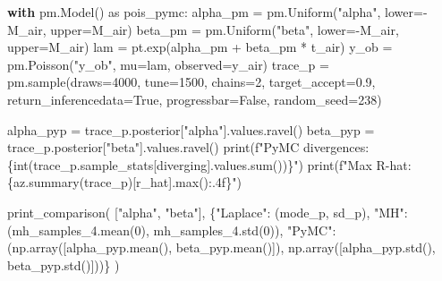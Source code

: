 \documentclass[
  letterpaper,
  DIV=11,
  numbers=noendperiod]{scrartcl}
\newenvironment{Shaded}{\begin{snugshade}}{\end{snugshade}}
\newcommand{\BuiltInTok}[1]{\textcolor[rgb]{0.00,0.23,0.31}{#1}}
\newcommand{\ControlFlowTok}[1]{\textcolor[rgb]{0.00,0.23,0.31}{\textbf{#1}}}
\newcommand{\DecValTok}[1]{\textcolor[rgb]{0.68,0.00,0.00}{#1}}
\newcommand{\FloatTok}[1]{\textcolor[rgb]{0.68,0.00,0.00}{#1}}
\newcommand{\ImportTok}[1]{\textcolor[rgb]{0.00,0.46,0.62}{#1}}
\newcommand{\NormalTok}[1]{\textcolor[rgb]{0.00,0.23,0.31}{#1}}
\newcommand{\OperatorTok}[1]{\textcolor[rgb]{0.37,0.37,0.37}{#1}}
\newcommand{\SpecialCharTok}[1]{\textcolor[rgb]{0.37,0.37,0.37}{#1}}
\newcommand{\SpecialStringTok}[1]{\textcolor[rgb]{0.13,0.47,0.30}{#1}}
\newcommand{\StringTok}[1]{\textcolor[rgb]{0.13,0.47,0.30}{#1}}
\newcommand{\VariableTok}[1]{\textcolor[rgb]{0.07,0.07,0.07}{#1}}
\begin{document}
\begin{Shaded}
\begin{Highlighting}[]
\ControlFlowTok{with}\NormalTok{ pm.Model() }\ImportTok{as}\NormalTok{ pois\_pymc:}
\NormalTok{    alpha\_pm }\OperatorTok{=}\NormalTok{ pm.Uniform(}\StringTok{"alpha"}\NormalTok{, lower}\OperatorTok{={-}}\NormalTok{M\_air, upper}\OperatorTok{=}\NormalTok{M\_air)}
\NormalTok{    beta\_pm  }\OperatorTok{=}\NormalTok{ pm.Uniform(}\StringTok{"beta"}\NormalTok{,  lower}\OperatorTok{={-}}\NormalTok{M\_air, upper}\OperatorTok{=}\NormalTok{M\_air)}
\NormalTok{    lam }\OperatorTok{=}\NormalTok{ pt.exp(alpha\_pm }\OperatorTok{+}\NormalTok{ beta\_pm }\OperatorTok{*}\NormalTok{ t\_air)}
\NormalTok{    y\_ob }\OperatorTok{=}\NormalTok{ pm.Poisson(}\StringTok{"y\_ob"}\NormalTok{, mu}\OperatorTok{=}\NormalTok{lam, observed}\OperatorTok{=}\NormalTok{y\_air)}
\NormalTok{    trace\_p }\OperatorTok{=}\NormalTok{ pm.sample(draws}\OperatorTok{=}\DecValTok{4000}\NormalTok{, tune}\OperatorTok{=}\DecValTok{1500}\NormalTok{, chains}\OperatorTok{=}\DecValTok{2}\NormalTok{,}
\NormalTok{                        target\_accept}\OperatorTok{=}\FloatTok{0.9}\NormalTok{, return\_inferencedata}\OperatorTok{=}\VariableTok{True}\NormalTok{,}
\NormalTok{                        progressbar}\OperatorTok{=}\VariableTok{False}\NormalTok{, random\_seed}\OperatorTok{=}\DecValTok{238}\NormalTok{)}

\NormalTok{alpha\_pyp }\OperatorTok{=}\NormalTok{ trace\_p.posterior[}\StringTok{"alpha"}\NormalTok{].values.ravel()}
\NormalTok{beta\_pyp  }\OperatorTok{=}\NormalTok{ trace\_p.posterior[}\StringTok{"beta"}\NormalTok{].values.ravel()}
\BuiltInTok{print}\NormalTok{(}\SpecialStringTok{f"PyMC divergences: }\SpecialCharTok{\{}\BuiltInTok{int}\NormalTok{(trace\_p.sample\_stats[}\StringTok{\textquotesingle{}diverging\textquotesingle{}}\NormalTok{].values.}\BuiltInTok{sum}\NormalTok{())}\SpecialCharTok{\}}\SpecialStringTok{"}\NormalTok{)}
\BuiltInTok{print}\NormalTok{(}\SpecialStringTok{f"Max R{-}hat: }\SpecialCharTok{\{}\NormalTok{az}\SpecialCharTok{.}\NormalTok{summary(trace\_p)[}\StringTok{\textquotesingle{}r\_hat\textquotesingle{}}\NormalTok{]}\SpecialCharTok{.}\BuiltInTok{max}\NormalTok{()}\SpecialCharTok{:.4f\}}\SpecialStringTok{"}\NormalTok{)}

\NormalTok{print\_comparison(}
\NormalTok{    [}\StringTok{"alpha"}\NormalTok{, }\StringTok{"beta"}\NormalTok{],}
\NormalTok{    \{}\StringTok{"Laplace"}\NormalTok{: (mode\_p, sd\_p),}
     \StringTok{"MH"}\NormalTok{:      (mh\_samples\_4.mean(}\DecValTok{0}\NormalTok{), mh\_samples\_4.std(}\DecValTok{0}\NormalTok{)),}
     \StringTok{"PyMC"}\NormalTok{:    (np.array([alpha\_pyp.mean(), beta\_pyp.mean()]),}
\NormalTok{                 np.array([alpha\_pyp.std(),  beta\_pyp.std()]))\}}
\NormalTok{)}
\end{Highlighting}
\end{Shaded}
\end{document}
